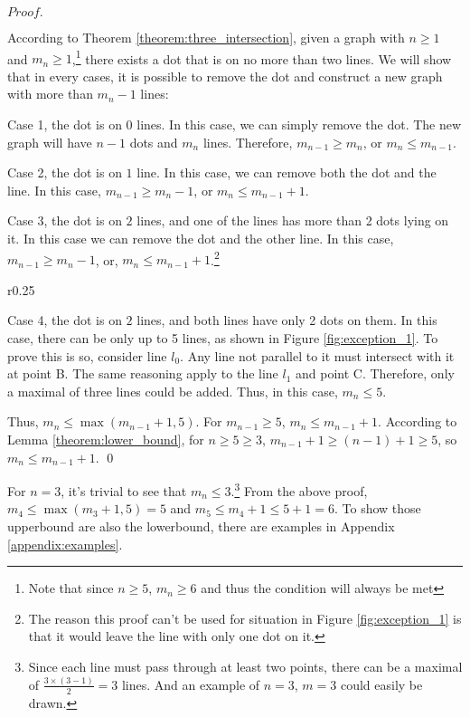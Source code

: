 \documentclass[a4paper, 12pt]{article}
\def\mypindent{1.35cm}
\newenvironment{my_indent}
 {\par\begingroup\leftskip\mypindent}
 {\par\endgroup}
\newcommand{\mycorf}{
    \leftskip-\mypindent
    \captionsetup{margin={-\mypindent,\mypindent}}}
\newcommand{\myproof}{
\vspace{-\parskip}$Proof.$\vspace{\dimexpr-\parskip-\baselineskip}}
\begin{document}
\myproof
\begin{my_indent}
According to Theorem \ref{theorem:three_intersection}, given a graph with $n\geq1$ and $m_n\geq1$,\footnote{Note that since $n\geq5$, $m_n\geq6$ and thus the condition will always be met} there exists a dot that is on no more than two lines. We will show that in every cases, it is possible to remove the dot and construct a new graph with more than $m_{n}-1$ lines:

Case 1, the dot is on $0$ lines. In this case, we can simply remove the dot. The new graph will have $n-1$ dots and $m_n$ lines. Therefore, $m_{n-1}\geq m_{n}$, or $m_{n}\leq m_{n-1}$.

Case 2, the dot is on $1$ line. In this case, we can remove both the dot and the line. In this case, $m_{n-1}\geq m_{n}-1$, or $m_{n}\leq m_{n-1}+1$.

Case 3, the dot is on $2$ lines, and one of the lines has more than 2 dots lying on it. In this case we can remove the dot and the other line. In this case, $m_{n-1}\geq m_{n}-1$, or, $m_{n}\leq m_{n-1}+1$.\footnote{The reason this proof can't be used for situation in Figure \ref{fig:exception_1} is that it would leave the line with only one dot on it.}

\begin{wrapfigure}{r}{0.25\textwidth}
    \mycorf
    \vspace{-0.5\baselineskip}
    
    \caption{3 potential lines when both line have only 2 dots}
    \label{fig:exception_1}
    \vspace{-1\baselineskip}
\end{wrapfigure}
Case 4, the dot is on $2$ lines, and both lines have only 2 dots on them. In this case, there can be only up to 5 lines, as shown in Figure \ref{fig:exception_1}. To prove this is so, consider line $l_0$. Any line not parallel to it must intersect with it at point B. The same reasoning apply to the line $l_1$ and point C. Therefore, only a maximal of three lines could be added. Thus, in this case, $m_{n}\leq{5}$.

Thus, $m_{n}\leq\max(m_{n-1}+1,5)$. For $m_{n-1}\geq5$, $m_n\leq m_{n-1}+1$.
According to Lemma \ref{theorem:lower_bound}, for $n\geq5\geq3$, $m_{n-1}+1\geq (n-1)+1\geq5$, so $m_n\leq m_{n-1}+1$.
\qed
\end{my_indent}

For $n=3$, it's trivial to see that $m_n\leq3$.\footnote{Since each line must pass through at least two points, there can be a maximal of $\frac{3\times(3-1)}{2}=3$ lines. And an example of $n=3$, $m=3$ could easily be drawn.} From the above proof, $m_4\leq\max(m_3+1,5)=5$ and $m_5\leq m_4+1\leq 5+1=6$. To show those upperbound are also the lowerbound, there are examples in Appendix \ref{appendix:examples}.
\end{document}
